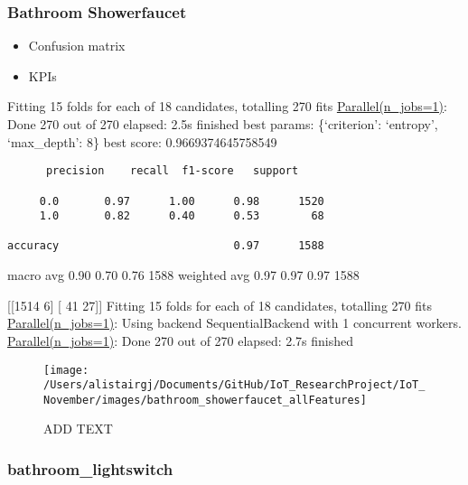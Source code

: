 \documentclass[11pt,]{article}
\providecommand{\tightlist}{%
  \setlength{\itemsep}{0pt}\setlength{\parskip}{0pt}}
\begin{document}
\pagebreak

\hypertarget{bathroom-showerfaucet}{%
\subsubsection{Bathroom Showerfaucet}\label{bathroom-showerfaucet}}

\begin{itemize}
\tightlist
\item
  Confusion matrix
\item
  KPIs
\end{itemize}

Fitting 15 folds for each of 18 candidates, totalling 270 fits
\href{Done\%20270\%20out\%20of\%20270\%20\%7C\%20elapsed:\%202.1s\%20finished}{Parallel(n\_jobs=1)}:
Done 270 out of 270 \textbar{} elapsed: 2.5s finished best params:
\{`criterion': `entropy', `max\_depth': 8\} best score:
0.9669374645758549

\begin{verbatim}
      precision    recall  f1-score   support

     0.0       0.97      1.00      0.98      1520
     1.0       0.82      0.40      0.53        68

accuracy                           0.97      1588
\end{verbatim}

macro avg 0.90 0.70 0.76 1588 weighted avg 0.97 0.97 0.97 1588

{[}{[}1514 6{]} {[} 41 27{]}{]} Fitting 15 folds for each of 18
candidates, totalling 270 fits
\href{Done\%20270\%20out\%20of\%20270\%20\%7C\%20elapsed:\%202.1s\%20finished}{Parallel(n\_jobs=1)}:
Using backend SequentialBackend with 1 concurrent workers.
\href{Done\%20270\%20out\%20of\%20270\%20\%7C\%20elapsed:\%202.1s\%20finished}{Parallel(n\_jobs=1)}:
Done 270 out of 270 \textbar{} elapsed: 2.7s finished

\begin{figure}[H]

{\centering \texttt{[image: /Users/alistairgj/Documents/GitHub/IoT\_ResearchProject/IoT\_November/images/bathroom\_showerfaucet\_allFeatures]} 

}

\caption{ADD TEXT}\label{fig:unnamed-chunk-6}
\end{figure}

\pagebreak

\hypertarget{bathroom_lightswitch}{%
\subsubsection{bathroom\_lightswitch}\label{bathroom_lightswitch}}
\end{document}
